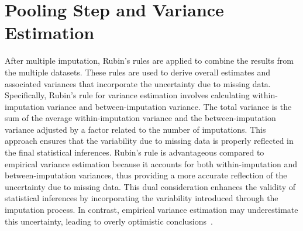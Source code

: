 \section{Pooling Step and Variance Estimation}
After multiple imputation, Rubin's rules are applied to combine the results from the multiple datasets. 
These rules are used to derive overall estimates and associated variances that incorporate the uncertainty due to missing data. 
Specifically, Rubin's rule for variance estimation involves calculating within-imputation variance and between-imputation variance. 
The total variance is the sum of the average within-imputation variance and the between-imputation variance adjusted by a factor related to the number of imputations. 
This approach ensures that the variability due to missing data is properly reflected in the final statistical inferences. 
Rubin's rule is advantageous compared to empirical variance estimation because it accounts for both within-imputation and between-imputation variances, thus providing a more accurate reflection of the uncertainty due to missing data. 
This dual consideration enhances the validity of statistical inferences by incorporating the variability introduced through the imputation process. 
In contrast, empirical variance estimation may underestimate this uncertainty, leading to overly optimistic conclusions~\cite{rubin2018multiple}.


